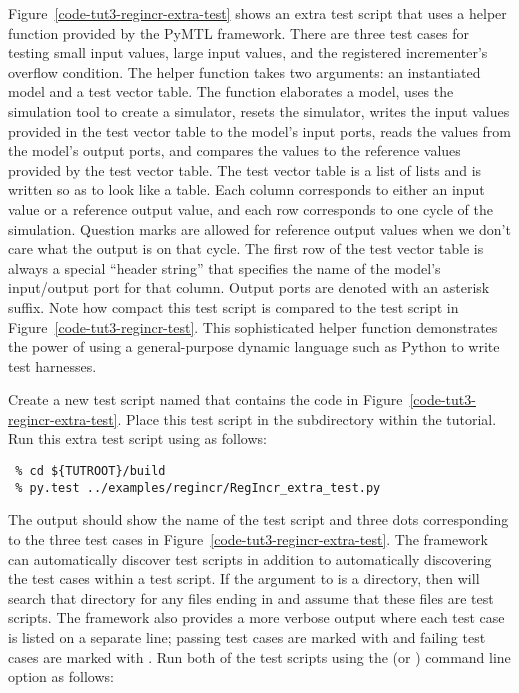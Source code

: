 \documentclass{cbxdoc}
\begin{document}



Figure~\ref{code-tut3-regincr-extra-test} shows an extra test script that
uses a helper function provided by the PyMTL framework. There are three
test cases for testing small input values, large input values, and the
registered incrementer's overflow condition. The
 helper function takes two arguments: an
instantiated model and a test vector table. The function elaborates a
model, uses the simulation tool to create a simulator, resets the
simulator, writes the input values provided in the test vector table to
the model's input ports, reads the values from the model's output ports,
and compares the values to the reference values provided by the test
vector table. The test vector table is a list of lists and is written so
as to look like a table. Each column corresponds to either an input value
or a reference output value, and each row corresponds to one cycle of the
simulation. Question marks are allowed for reference output values when
we don't care what the output is on that cycle. The first row of the test
vector table is always a special ``header string'' that specifies the
name of the model's input/output port for that column. Output ports are
denoted with an asterisk suffix. Note how compact this test script is
compared to the test script in Figure~\ref{code-tut3-regincr-test}. This
sophisticated helper function demonstrates the power of using a
general-purpose dynamic language such as Python to write test harnesses.

Create a new test script named  that contains
the code in Figure~\ref{code-tut3-regincr-extra-test}. Place this test
script in the  subdirectory within the tutorial. Run
this extra test script using  as follows:

\begin{verbatim}
 % cd ${TUTROOT}/build
 % py.test ../examples/regincr/RegIncr_extra_test.py
\end{verbatim}

The output should show the name of the test script and three dots
corresponding to the three test cases in
Figure~\ref{code-tut3-regincr-extra-test}. The  framework can
automatically discover test scripts in addition to automatically
discovering the test cases within a test script. If the argument to
 is a directory, then  will search that directory
for any files ending in  and assume that these files are
test scripts. The  framework also provides a more verbose
output where each test case is listed on a separate line; passing test
cases are marked with  and failing test cases are marked with
. Run both of the test scripts using the  (or
) command line option as follows:
\end{document}
